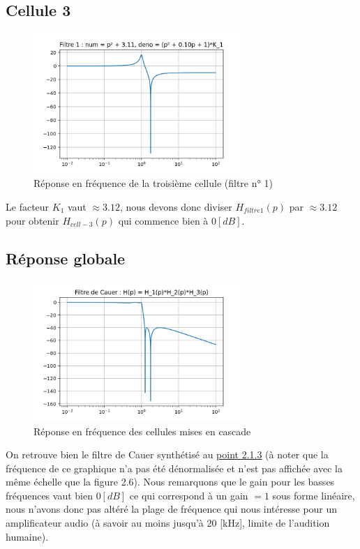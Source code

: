 \documentclass[a4paper,12pt,oneside]{report}	%
\begin{document}
\newpage
        \subsection{Cellule 3}
            \begin{figure}[h!]
                \centering
                \includegraphics[width = 8cm]{code-projet-python/2.0.4 - Filtre 1.png}
                \caption{Réponse en fréquence de la troisième cellule (filtre n° 1)}
                \label{fig:repfreq-filtre-1}
            \end{figure}
            Le facteur $K_1$ vaut $\approx 3.12$, nous devons donc diviser $H_{filtre 1}(p)$ par $\approx 3.12$ pour obtenir $H_{cell-3}(p)$ qui commence bien à $0 [dB]$.
        \subsection{Réponse globale}
            \begin{figure}[h!]
                \centering
                \includegraphics[width = 8cm]{code-projet-python/2.0.4 - Cauer.png}
                \caption{Réponse en fréquence des cellules mises en cascade}
                \label{fig:repfreq-filtre-1}
            \end{figure}
            On retrouve bien le filtre de Cauer synthétisé au \hyperref[fig:repfreq-Cauer]{point 2.1.3} (à noter que la fréquence de ce graphique n'a pas été dénormalisée et n'est pas affichée avec la même échelle que la figure 2.6). Nous remarquons que le gain pour les basses fréquences vaut bien $0[dB]$ ce qui correspond à un gain $= 1$ sous forme linéaire, nous n'avons donc pas altéré la plage de fréquence qui nous intéresse pour un amplificateur audio (à savoir au moins jusqu'à 20 [kHz], limite de l'audition humaine).
\newpage
\end{document}
